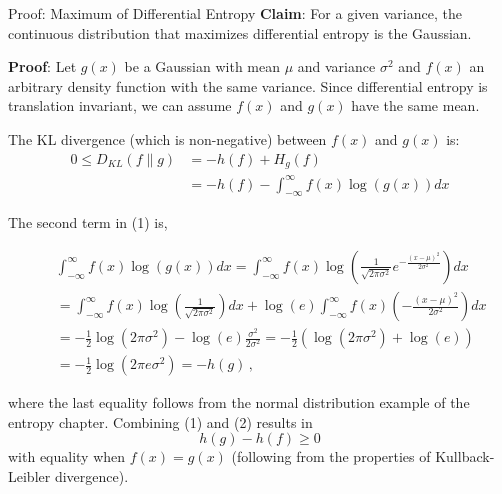 \documentclass[11pt,compress,t,notes=noshow, xcolor=table]{beamer}
\begin{document}
\begin{vbframe}{Proof: Maximum of Differential Entropy}
  \textbf{Claim}: For a given variance, the continuous distribution that maximizes differential entropy is the Gaussian.

  \lz

  \textbf{Proof}: Let $g(x)$ be a Gaussian with mean $\mu$ and variance $\sigma^2$ and $f(x)$ an arbitrary density function with the same variance. Since differential entropy is translation invariant, we can assume $f(x)$ and $g(x)$ have the same mean.

  \lz
  
  The KL divergence (which is non-negative) between $f(x)$ and $g(x)$ is:
  \begin{equation}
    \begin{aligned}
       0 \leq D_{KL}(f \| g) & = -h(f) + H_g(f) \\
                             & =-h(f)-\int_{-\infty}^{\infty} f(x) \log (g(x)) dx
    \end{aligned}
  \end{equation}
  
  \framebreak
  
The second term in (1) is, 
  
\begin{footnotesize}
\begin{eqnarray}
& & \int_{-\infty}^{\infty} f(x) \log (g(x)) d x =\int_{-\infty}^{\infty} f(x) \log \left(\frac{1}{\sqrt{2 \pi \sigma^{2}}} e^{-\frac{(x-\mu)^{2}}{2 \sigma^{2}}}\right) d x \nonumber\\ 
& &=\int_{-\infty}^{\infty} f(x) \log \left(\frac{1}{\sqrt{2 \pi \sigma^{2}}}\right) d x+\log (e) \int_{-\infty}^{\infty} f(x)\left(-\frac{(x-\mu)^{2}}{2 \sigma^{2}}\right) d x \nonumber\\ 
& &= -\frac{1}{2} \log \left(2 \pi \sigma^{2}\right)-\log (e) \frac{\sigma^{2}}{2 \sigma^{2}} = -\frac{1}{2} (\log \left(2 \pi \sigma^{2}\right)+\log (e) ) \nonumber\\ 
& &=-\frac{1}{2} \log \left(2 \pi e \sigma^{2}\right) = -h(g) \,,
\end{eqnarray}
\end{footnotesize}

where the last equality follows from the normal distribution example of the entropy chapter. Combining (1) and (2) results in
$$h(g) - h(f) \geq 0$$
with equality when $f(x) = g(x)$ (following from the properties of Kullback-Leibler divergence).
\end{vbframe}
\end{document}
